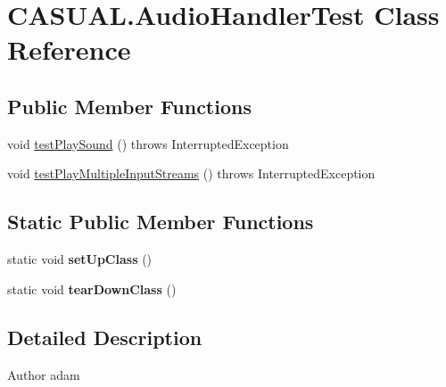 \hypertarget{classCASUAL_1_1AudioHandlerTest}{\section{C\-A\-S\-U\-A\-L.\-Audio\-Handler\-Test Class Reference}
\label{classCASUAL_1_1AudioHandlerTest}
}
\subsection*{Public Member Functions}
\begin{DoxyCompactItemize}
\item 
void \hyperlink{classCASUAL_1_1AudioHandlerTest_a0274d24647e0c4ffa280fb0a78ebe6fc}{test\-Play\-Sound} ()  throws Interrupted\-Exception 
\item 
void \hyperlink{classCASUAL_1_1AudioHandlerTest_a8d96b51a3b631ec2c8ca3db8ef15f0b6}{test\-Play\-Multiple\-Input\-Streams} ()  throws Interrupted\-Exception 
\end{DoxyCompactItemize}
\subsection*{Static Public Member Functions}
\begin{DoxyCompactItemize}
\item 
\hypertarget{classCASUAL_1_1AudioHandlerTest_a9de59baf425c062744e14c0c5749968d}{static void {\bfseries set\-Up\-Class} ()}\label{classCASUAL_1_1AudioHandlerTest_a9de59baf425c062744e14c0c5749968d}

\item 
\hypertarget{classCASUAL_1_1AudioHandlerTest_a94665934d921f86a582c63bfa5d73af7}{static void {\bfseries tear\-Down\-Class} ()}\label{classCASUAL_1_1AudioHandlerTest_a94665934d921f86a582c63bfa5d73af7}

\end{DoxyCompactItemize}


\subsection{Detailed Description}
\begin{DoxyAuthor}{Author}
adam 
\end{DoxyAuthor}


